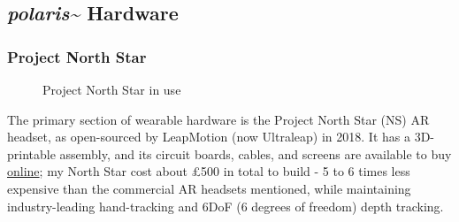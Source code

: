 \subsection{\textit{polaris\textasciitilde{}} Hardware}\label{sec: polaris-framework-hardware}
\subsubsection{Project North Star}\label{sec: polaris-framework-hardware-pns}

\begin{figure}
    \centering
    \hfill
    \caption{Project North Star in use}
\end{figure}

The primary section of wearable hardware is the Project North Star (NS) AR headset, as open-sourced by LeapMotion (now Ultraleap) in 2018. It has a 3D-printable assembly, and its circuit boards, cables, and screens are available to buy \href{https://docs.projectnorthstar.org}{online}; my North Star cost about £500 in total to build - 5 to 6 times less expensive than the commercial AR headsets mentioned, while maintaining industry-leading hand-tracking and 6DoF (6 degrees of freedom) depth tracking.

